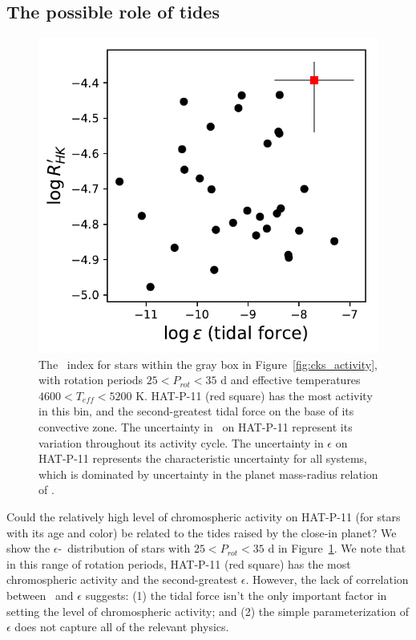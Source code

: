 \subsection{The possible role of tides}

\begin{figure}
\begin{center}
\includegraphics[scale=0.7]{sindex/tides_rhk.pdf}
\caption{The \rprime\ index for stars within the gray box in Figure~\ref{fig:cks_activity}, with rotation periods $25 < P_{rot} < 35$ d and effective temperatures $4600 < T_{eff} < 5200$ K. HAT-P-11 (red square) has the most activity in this bin, and the second-greatest tidal force on the base of its convective zone. The uncertainty in \rprime\ on HAT-P-11 represent its variation throughout its activity cycle. The uncertainty in $\epsilon$ on HAT-P-11 represents the characteristic uncertainty for all systems, which is dominated by uncertainty in the planet mass-radius relation of \citet{Chen2017}.}
\label{fig:rhk_eps}
\end{center}
\end{figure}

Could the relatively high level of chromospheric activity on HAT-P-11 (for stars with its age and color) be related to the tides raised by the close-in planet? We show the $\epsilon$-\rprime\ distribution of stars with $25 < P_{rot} < 35$ d in Figure~\ref{fig:rhk_eps}. We note that in this range of rotation periods, HAT-P-11 (red square) has the most chromospheric activity and the second-greatest $\epsilon$. However, the lack of  correlation between \rprime\ and $\epsilon$ suggests: (1) the tidal force isn't the only important factor in setting the level of chromospheric activity; and (2) the simple parameterization of $\epsilon$ does not capture all of the relevant physics. 

